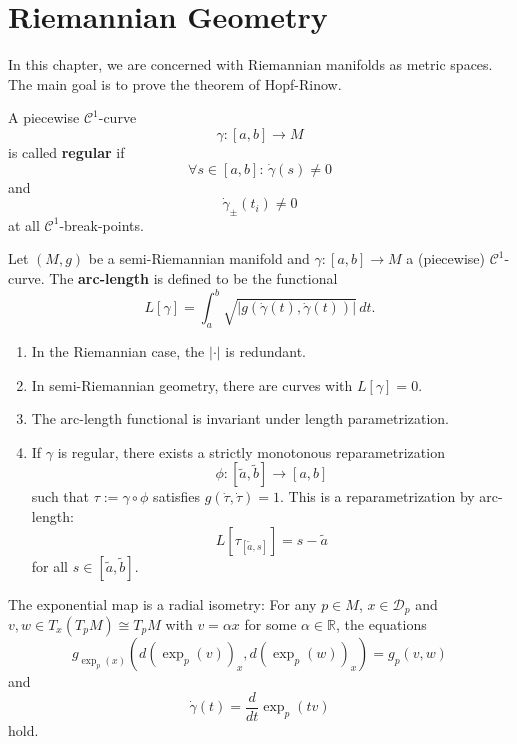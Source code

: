 \chapter{Riemannian Geometry}
In this chapter, we are concerned with Riemannian manifolds as metric spaces. The main goal is to prove the theorem of Hopf-Rinow.
\begin{definition}
   A piecewise $\mathcal{C}^1$-curve \[
       \gamma: [a,b] \to M
   \] is called \textbf{regular} if 
   \[
       \forall s \in [a,b]:\, \dot{\gamma}(s)\neq 0
   \] and \[
   \dot{\gamma}_{\pm}(t_i) \neq 0
   \] at all $\mathcal{C}^1$-break-points.
\end{definition} 
\begin{definition}
    Let $(M,g)$ be a semi-Riemannian manifold and $\gamma: [a,b]\to M$ a (piecewise) $\mathcal{C}^1$-curve. The \textbf{arc-length} is defined to be the functional
    \[
        L[\gamma] = \int_a^b \sqrt{| g(\dot{\gamma}(t), \dot{\gamma}(t))|} \, dt
    .\] 
\end{definition}
\begin{remark}
   \begin{enumerate}
      \item In the Riemannian case, the $| \cdot |$ is redundant.
        \item In semi-Riemannian geometry, there are curves with $L[\gamma]=0$.
        \item The arc-length functional is invariant under length parametrization.
        \item If $\gamma$ is regular, there exists a strictly monotonous reparametrization \[
            \phi: [\tilde{a}, \tilde{b}] \to [a,b] \] such that $\tau := \gamma \circ \phi$ satisfies $g(\dot{\tau}, \dot{\tau})=1$. This is a reparametrization by arc-length: \[
            L[\tau_{[\tilde{a},s]}]=s-\tilde{a}
        \] for all $s \in [\tilde{a}, \tilde{b}]$.
   \end{enumerate} 
\end{remark}

\begin{theorem}
   The exponential map is a radial isometry: For any $p \in M$, $x \in \mathcal{D}_p$ and $v,w \in T_x(T_pM) \cong T_pM$ with $v = \alpha x$ for some $\alpha \in \mathbb{R}$, the equations \[
       g_{\exp_p(x)}(d(\exp_p(v))_x, d(\exp_p(w))_x)=g_p(v,w)
   \]  and \[
   \dot{\gamma}(t)=\frac{d}{dt}\exp_p(tv)
   \] hold.
\end{theorem}
